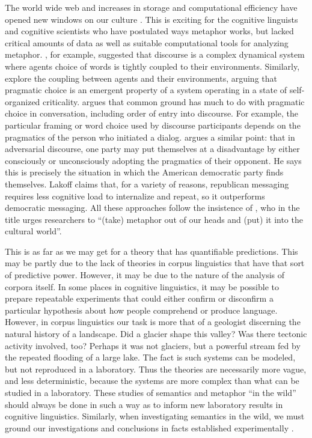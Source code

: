 The world wide web and increases in storage and computational efficiency have
opened new windows on our culture \cite{Griffiths2015}. 
This is exciting for the cognitive
linguists and cognitive scientists who have postulated ways metaphor works, but
lacked critical amounts of data as well as suitable computational tools for 
analyzing metaphor. , for example, suggested that discourse
is a complex dynamical system where agents choice of words is tightly coupled
to their environments. Similarly,  explore the coupling 
between agents and their environments, arguing that pragmatic choice is an
emergent property of a system operating in a state of self-organized 
criticality.  argues that common ground has much to do with
pragmatic choice in conversation, including order of entry into discourse. For
example, the particular framing or word choice used by discourse participants
depends on the pragmatics of the person who initiated a dialog. 
 argues a similar point: that in adversarial discourse, one
party may put themselves at a disadvantage by either consciously or unconsciously
adopting the pragmatics of their opponent. He says this is precisely the 
situation in which the American democratic party finds themselves. Lakoff claims
that, for a variety of reasons, republican messaging requires less
cognitive load to internalize and repeat, so it outperforms democratic 
messaging. All these approaches follow the insistence of , who
in the title urges researchers to ``(take) metaphor out of our heads and (put)
it into the cultural world''.

This is as far as we may get for a theory that has quantifiable predictions. This
may be partly due to the lack of theories in corpus linguistics that have that
sort of predictive power. However, it may be due to the nature of the 
analysis of corpora itself. In some places in cognitive linguistics, it may
be possible to prepare repeatable experiments that could either confirm or
disconfirm a particular hypothesis about how people comprehend or produce
language. However, in corpus linguistics our task is more that of a geologist
discerning the natural history of a landscape. Did a glacier shape this valley?
Was there tectonic activity involved, too? Perhaps it was not glaciers, but
a powerful stream fed by the repeated flooding of a large lake. The fact is
such systems can be modeled, but not reproduced in a laboratory. Thus the 
theories are necessarily more vague, and less deterministic, because the 
systems are more complex than what can be studied in a laboratory. These
studies of semantics and metaphor ``in the wild'' should always be done in
such a way as to inform new laboratory results in cognitive linguistics.
Similarly, when investigating semantics in the wild, we must ground our 
investigations and conclusions in facts established experimentally 
\cite{Arppe2010}.


